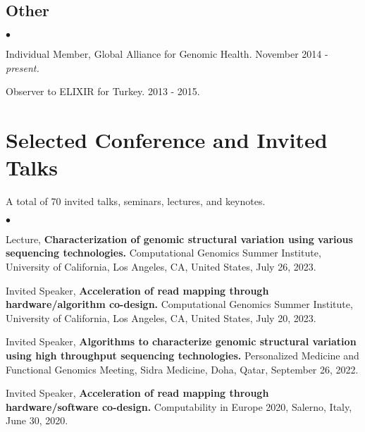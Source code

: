 \documentclass[margin,line]{res}
\newenvironment{list2}{
  \begin{list}{$\bullet$}{%
      \setlength{\itemsep}{0.1cm}
      \setlength{\parsep}{0in} \setlength{\parskip}{0in}
      \setlength{\topsep}{0in} \setlength{\partopsep}{0in} 
      \setlength{\leftmargin}{0.2in}}}{\end{list}}
\newcommand{\junk}[1]{}
\begin{document}
\begin{resume}
\vspace{-0.4cm}
\subsection{\small \sc Other}
\begin{list2}
\item
  Individual Member, Global Alliance for Genomic Health. November 2014 - {\it present.}
\item
  Observer to ELIXIR for Turkey. 2013 - 2015.
\end{list2}

\clearpage
\vspace*{-.2cm}
\section{\sc Selected Conference and Invited Talks}
{\small
A total of 70 invited talks, seminars, lectures, and keynotes.
}\\

\begin{list2}

\item
  Lecture, 
      {\bf  Characterization of genomic structural variation using various sequencing technologies.}
  Computational Genomics Summer Institute, University of California, Los Angeles, CA, United States,
  July 26, 2023.

\item
  Invited Speaker, 
      {\bf  Acceleration of read mapping through hardware/algorithm co-design.}
  Computational Genomics Summer Institute, University of California, Los Angeles, CA, United States,
  July 20, 2023.

\item
Invited Speaker, {\bf Algorithms to characterize genomic structural variation using high throughput sequencing technologies.} Personalized Medicine and Functional Genomics Meeting, Sidra Medicine, Doha, Qatar, September 26, 2022.

\junk{
\item
  Lecture, 
      {\bf  Characterization of genomic structural variation using various sequencing technologies.}
  Clinical genomics and NGS hybrid course, European School of Genetic Medicine and Acıbadem University, İstanbul, Turkey,
  October 13, 2020.
  }
 \item
 Invited Speaker,
{\bf Acceleration of read mapping through hardware/software co-design.}
Computability in Europe 2020, Salerno, Italy, June 30, 2020.


\end{list2}
\end{resume}
\end{document}
